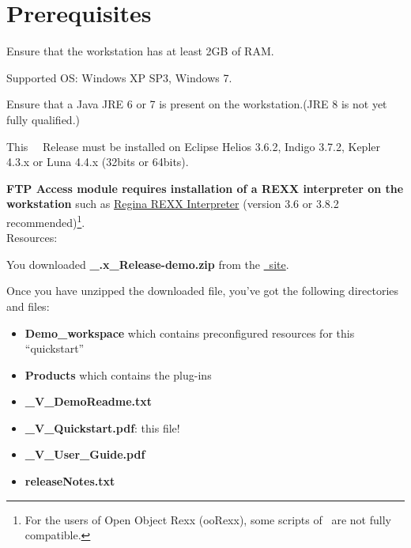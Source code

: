 \section{Prerequisites}

Ensure that the workstation has at least 2GB of RAM.

Supported OS: Windows XP SP3, Windows 7.

Ensure that a Java JRE 6 or 7 is present on the workstation.(JRE 8 is not yet fully qualified.)

This \mxproduct~\mxversion~Release must be installed on Eclipse Helios 3.6.2, Indigo 3.7.2, Kepler 4.3.x or Luna 4.4.x (32bits or 64bits).

\textbf{FTP Access module requires installation of a REXX interpreter on the workstation }such as
\href{http://sourceforge.net/projects/regina-rexx/files/regina-rexx/}{Regina REXX Interpreter} (version 3.6 or 3.8.2 recommended)\footnote{
For the users of Open Object Rexx (ooRexx), some scripts of \mxproduct~are not fully compatible.}.
\\[1.5ex]

Resources:

You downloaded \textbf{\mxproduct\_\mxversion.x\_Release-demo.zip }
 from the
\href{\mxurl}{\mxproduct~site}.

Once you have unzipped the downloaded file, you've got the following directories and files:

\begin{itemize}
\item \textbf{Demo\_workspace} which contains preconfigured resources for this ``quickstart''

\item \textbf{Products} which contains the plug-ins

\item \textbf{\mxproduct\_V\mxversion\_DemoReadme.txt}

\item \textbf{\mxproduct\_V\mxversion\_Quickstart.pdf}: this file!

\item \textbf{\mxproduct\_V\mxversion\_User\_Guide.pdf}

\item \textbf{releaseNotes.txt}
\end{itemize}
